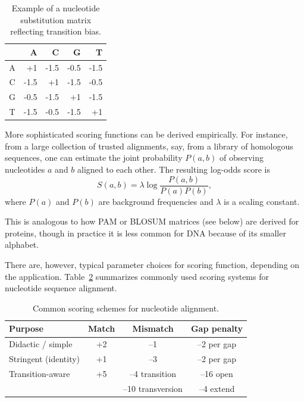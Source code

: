 \begin{table}[htbp]
\caption{Example of a nucleotide substitution matrix reflecting transition bias.}
\label{tab:nt_substitution_matrix}
\centering
\begin{tabular}{c|rrrr}
  & A & C & G & T \\
  \hline
  A & +1 & -1.5 & -0.5 & -1.5 \\
  C & -1.5 & +1 & -1.5 & -0.5 \\
  G & -0.5 & -1.5 & +1 & -1.5 \\
  T & -1.5 & -0.5 & -1.5 & +1 \\
\end{tabular}
\end{table}

More sophisticated scoring functions can be derived empirically.
For instance, from a large collection of trusted alignments, say, from a library of homologous sequences, one can estimate the joint probability $P(a,b)$ of observing nucleotides $a$ and $b$ aligned to each other.  The resulting log-odds score is
\begin{equation}
S(a,b) = \lambda \log \frac{P(a,b)}{P(a)P(b)},
\end{equation}
where $P(a)$ and $P(b)$ are background frequencies and $\lambda$ is a scaling constant.

This is analogous to how PAM or BLOSUM matrices (see below) are derived for proteins, though in practice it is less common for DNA because of its smaller alphabet.

There are, however, typical parameter choices for scoring function, depending on the application. Table~\ref{tab:typical_params} summarizes commonly used scoring systems for nucleotide sequence alignment.

\begin{table}[h]
\caption{Common scoring schemes for nucleotide alignment.}
\label{tab:typical_params}
\begin{tabular}{lccc}
\toprule
Purpose & Match & Mismatch & Gap penalty \\
\midrule
Didactic / simple & +2 & --1 & --2 per gap \\
Stringent (identity) & +1 & --3 & --2 per gap  \\
Transition-aware & +5 & --4 transition & --16 open \\
& & --10 transversion & --4 extend \\
\bottomrule
\end{tabular}
\end{table}

